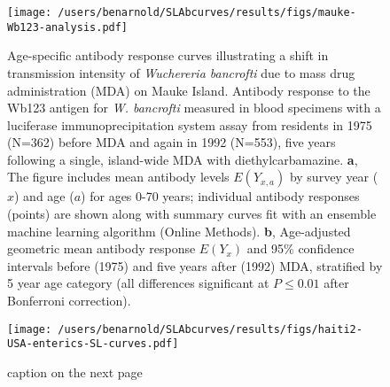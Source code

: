 \documentclass[11pt]{article}
\begin{document}
\begin{figure}[htbp]
\begin{center}
\begin{minipage}{\textwidth}
\label{fig:garki}
\end{minipage}
\end{center}
\end{figure}



\begin{figure}[htbp]
\begin{center}
\texttt{[image: /users/benarnold/SLAbcurves/results/figs/mauke-Wb123-analysis.pdf]}
\begin{minipage}{\textwidth}
\caption{Age-specific antibody response curves illustrating a shift in transmission intensity of \textit{Wuchereria bancrofti} due to mass drug administration (MDA) on Mauke Island.  Antibody response to the Wb123 antigen for \textit{W. bancrofti} measured in blood specimens with a luciferase immunoprecipitation system assay from residents in 1975 (N=362) before MDA and again in 1992 (N=553), five years following a single, island-wide MDA with diethylcarbamazine. \textbf{a}, The figure includes mean antibody levels $E(Y_{x,a})$ by survey year ($x$) and age ($a$) for ages 0-70 years; individual antibody responses (points) are shown along with summary curves fit with an ensemble machine learning algorithm (Online Methods). \textbf{b}, Age-adjusted geometric mean antibody response $E(Y_{x})$ and 95\% confidence intervals before (1975) and five years after (1992) MDA, stratified by 5 year age category (all differences significant at $P\leq0.01$ after Bonferroni correction).  }
\label{fig:mauke}
\end{minipage}
\end{center}
\end{figure}


\begin{figure}[htbp]
\begin{center}
\texttt{[image: /users/benarnold/SLAbcurves/results/figs/haiti2-USA-enterics-SL-curves.pdf]}
\begin{minipage}{\textwidth}
\caption{caption on the next page}
\label{fig:enterics}
\end{minipage}
\end{center}
\end{figure}
\end{document}

